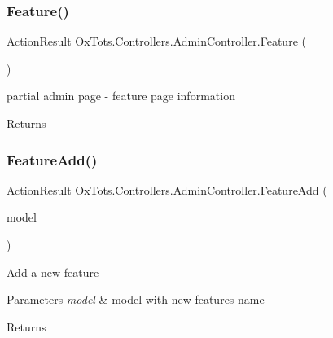 \subsubsection{\texorpdfstring{Feature()}{Feature()}}
{\footnotesize\ttfamily Action\+Result Ox\+Tots.\+Controllers.\+Admin\+Controller.\+Feature (\begin{DoxyParamCaption}{ }\end{DoxyParamCaption})\hspace{0.3cm}{\ttfamily [inline]}}



partial admin page -\/ feature page information 

\begin{DoxyReturn}{Returns}

\end{DoxyReturn}
\mbox{\label{class_ox_tots_1_1_controllers_1_1_admin_controller_a74ad302e5680cccb55042bcaef8ae30b}} 
\subsubsection{\texorpdfstring{FeatureAdd()}{FeatureAdd()}}
{\footnotesize\ttfamily Action\+Result Ox\+Tots.\+Controllers.\+Admin\+Controller.\+Feature\+Add (\begin{DoxyParamCaption}\item[{Admin\+Feature\+View\+Model}]{model }\end{DoxyParamCaption})\hspace{0.3cm}{\ttfamily [inline]}}



Add a new feature 


\begin{DoxyParams}{Parameters}
{\em model} & model with new features name\\
\hline
\end{DoxyParams}
\begin{DoxyReturn}{Returns}

\end{DoxyReturn}
\mbox{\label{class_ox_tots_1_1_controllers_1_1_admin_controller_a8aed7563cb97277b6cea0248808d9c13}} 
